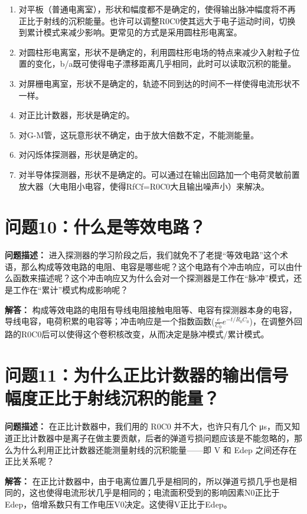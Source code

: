 \documentclass{article}
\begin{document}
\begin{enumerate}
    \item 对平板（普通电离室），形状和幅度都不是确定的，使得输出脉冲幅度将不再正比于射线的沉积能量。也许可以调整R0C0使其远大于电子运动时间，切换到累计模式来减少影响。更常见的方式是采用圆柱形电离室。
    \item 对圆柱形电离室，形状不是确定的，利用圆柱形电场的特点来减少入射粒子位置的变化，b/a既可使得电子漂移距离几乎相同，此时可以读取沉积的能量。
    \item 对屏栅电离室，形状不是确定的，轨迹不同到达的时间不一样使得电流形状不一样。
    \item 对正比计数器，形状是确定的。%
    \item 对G-M管，这玩意形状不确定，由于放大倍数不定，不能测能量。
    \item 对闪烁体探测器，形状是确定的。%
    \item 对半导体探测器，形状不是确定的。可以通过在输出回路加一个电荷灵敏前置放大器（大电阻小电容，使得RfCf=R0C0大且输出噪声小）来解决。
\end{enumerate}

\section{问题10：什么是等效电路？}
\label{sec:prob10}

\textbf{问题描述：} 进入探测器的学习阶段之后，我们就免不了老提“等效电路”这个术语，那么构成等效电路的电阻、电容是哪些呢？这个电路有个冲击响应，可以由什么函数来描述呢？这个冲击响应又为什么会对一个探测器是工作在“脉冲”模式，还是工作在“累计”模式构成影响呢？

\textbf{解答：} 构成等效电路的电阻有导线电阻接触电阻等、电容有探测器本身的电容，导线电容，电荷积累的电容等；冲击响应是一个指数函数($\frac{e}{C_0}e^{-t/R_0C_0}$)，在调整外回路的R0C0后可以使得这个卷积核改变，从而决定是脉冲模式/累计模式。

\section{问题11：为什么正比计数器的输出信号幅度正比于射线沉积的能量？}
\label{sec:prob11}

\textbf{问题描述：} 在正比计数器中，我们用的 R0C0 并不大，也许只有几个 μs，而又知道正比计数器中是离子在做主要贡献，后者的弹道亏损问题应该是不能忽略的，那么为什么利用正比计数器还能测量射线的沉积能量——即 V 和 Edep 之间还存在正比关系呢？

\textbf{解答：} 在正比计数器中，由于电离位置几乎是相同的，所以弹道亏损几乎也是相同的，这也使得电流形状几乎是相同的；电流面积受到的影响因素N0正比于Edep，倍增系数只有工作电压V0决定。这使得V正比于Edep。
\end{document}

